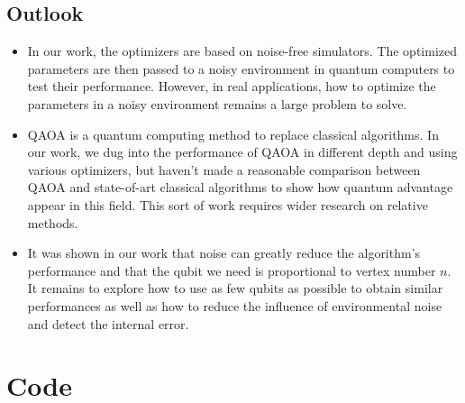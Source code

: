 \documentclass{./source/Report}
\begin{document}
\subsection{Outlook}

\begin{itemize}
    \item In our work, the optimizers are based on noise-free simulators. The optimized parameters are then passed to a noisy environment in quantum computers to test their performance. However, in real applications, how to optimize the parameters in a noisy environment remains a large problem to solve.
    \item QAOA is a quantum computing method to replace classical algorithms. In our work, 
we dug into the performance of QAOA in different depth and using various optimizers, 
but haven't made a reasonable comparison between QAOA and state-of-art classical algorithms to show 
how quantum advantage appear in this field. This sort of work requires wider research on 
relative methods. 
    \item It was shown in our work that noise can greatly reduce the algorithm's 
performance and that the qubit we need is proportional to vertex number $n$. It remains to explore how 
to use as few qubits as possible to obtain similar performances as well 
as how to reduce the influence of environmental noise and detect the internal error.
\end{itemize}


\appendix

\section{Code}






\nocite{*}


\end{document}
